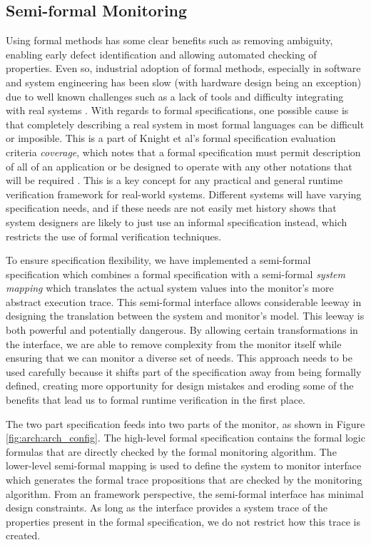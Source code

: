 \subsection{Semi-formal Monitoring}
Using formal methods has some clear benefits such as removing ambiguity, enabling early defect identification and allowing automated checking of properties. Even so, industrial adoption of formal methods, especially in software and system engineering has been slow (with hardware design being an exception) due to well known challenges such as a lack of tools and difficulty integrating with real systems \cite{Knight1998}. 
%
With regards to formal specifications, one possible cause is that completely describing a real system in most formal languages can be difficult or imposible. This is a part of Knight et al's formal specification evaluation criteria \emph{coverage}, which notes that a formal specification must permit description of all of an application or be designed to operate with any other notations that will be required \cite{Knight1997a}. 
This is a key concept for any practical and general runtime verification framework for real-world systems. Different systems will have varying specification needs, and if these needs are not easily met history shows that system designers are likely to just use an informal specification instead, which restricts the use of formal verification techniques.

To ensure specification flexibility, we have implemented a semi-formal specification which combines a formal specification with a semi-formal \emph{system mapping} which translates the actual system values into the monitor's more abstract execution trace. 
This semi-formal interface allows considerable leeway in designing the translation between the system and monitor's model. This leeway is both powerful and potentially dangerous. 
By allowing certain transformations in the interface, we are able to remove complexity from the monitor itself while ensuring that we can monitor a diverse set of needs.
This approach needs to be used carefully because it shifts part of the specification away from being formally defined, creating more opportunity for design mistakes and eroding some of the benefits that lead us to formal runtime verification in the first place.

The two part specification feeds into two parts of the monitor, as shown in Figure \ref{fig:arch:arch_config}. 
The high-level formal specification contains the formal logic formulas that are directly checked by the formal monitoring algorithm.
The lower-level semi-formal mapping is used to define the system to monitor interface which generates the formal trace propositions that are checked by the monitoring algorithm. From an framework perspective, the semi-formal interface has minimal design constraints. 
As long as the interface provides a system trace of the properties present in the formal specification, we do not restrict how this trace is created.

